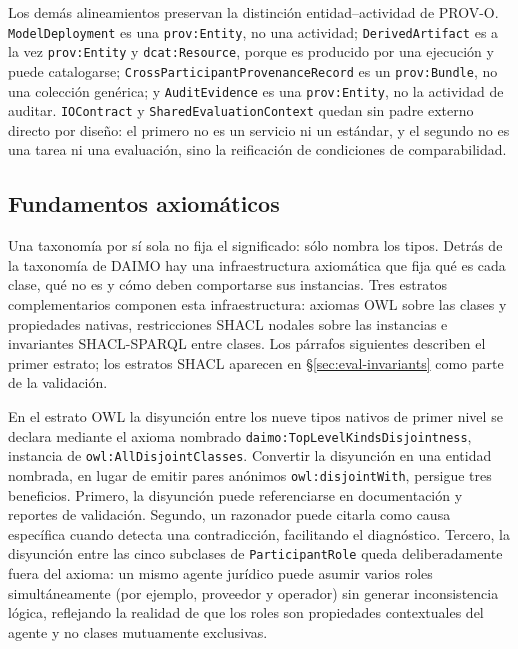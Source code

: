 \documentclass[Afour,sagev,times]{sagej}
\newcommand{\code}[1]{\texttt{#1}}
\begin{document}
Los demás alineamientos preservan la distinción entidad--actividad de PROV-O. \code{ModelDeployment} es una \code{prov:Entity}, no una actividad; \code{DerivedArtifact} es a la vez \code{prov:Entity} y \code{dcat:Resource}, porque es producido por una ejecución y puede catalogarse; \code{CrossParticipantProvenanceRecord} es un \code{prov:Bundle}, no una colección genérica; y \code{AuditEvidence} es una \code{prov:Entity}, no la actividad de auditar. \code{IOContract} y \code{SharedEvaluationContext} quedan sin padre externo directo por diseño: el primero no es un servicio ni un estándar, y el segundo no es una tarea ni una evaluación, sino la reificación de condiciones de comparabilidad.

\subsection{Fundamentos axiomáticos}\label{sec:axiomatic}

Una taxonomía por sí sola no fija el significado: sólo nombra los tipos. Detrás de la taxonomía de DAIMO hay una infraestructura axiomática que fija qué es cada clase, qué no es y cómo deben comportarse sus instancias. Tres estratos complementarios componen esta infraestructura: axiomas OWL sobre las clases y propiedades nativas, restricciones SHACL nodales sobre las instancias e invariantes SHACL-SPARQL entre clases. Los párrafos siguientes describen el primer estrato; los estratos SHACL aparecen en §\ref{sec:eval-invariants} como parte de la validación.

En el estrato OWL la disyunción entre los nueve tipos nativos de primer nivel se declara mediante el axioma nombrado \code{daimo:TopLevelKindsDisjointness}, instancia de \code{owl:AllDisjointClasses}. Convertir la disyunción en una entidad nombrada, en lugar de emitir pares anónimos \code{owl:disjointWith}, persigue tres beneficios. Primero, la disyunción puede referenciarse en documentación y reportes de validación. Segundo, un razonador puede citarla como causa específica cuando detecta una contradicción, facilitando el diagnóstico. Tercero, la disyunción entre las cinco subclases de \code{ParticipantRole} queda deliberadamente fuera del axioma: un mismo agente jurídico puede asumir varios roles simultáneamente (por ejemplo, proveedor y operador) sin generar inconsistencia lógica, reflejando la realidad de que los roles son propiedades contextuales del agente y no clases mutuamente exclusivas.
\end{document}

